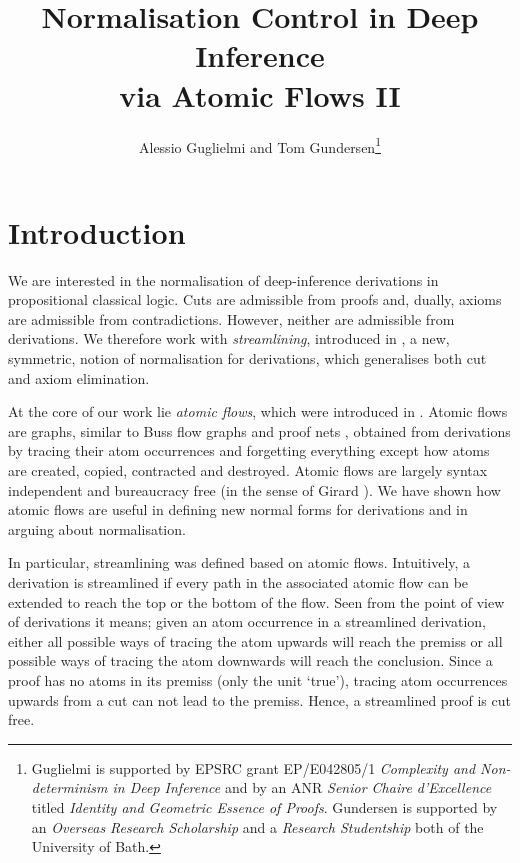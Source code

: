 \documentclass[a4paper]{llncs}
\begin{document}
\title{Normalisation Control in Deep Inference \\ via Atomic Flows II}

\author{Alessio Guglielmi and Tom Gundersen\thanks{Guglielmi is supported by EPSRC grant EP/E042805/1 \emph{Complexity and Non-determinism in Deep Inference} and by an ANR \emph{Senior Chaire d'Excellence} titled \emph{Identity and Geometric Essence of Proofs}. Gundersen is supported by an \emph{Overseas Research Scholarship} and a \emph{Research Studentship} both of the University of Bath.}}


\maketitle

\section{Introduction}


We are interested in the normalisation of deep-inference derivations in propositional classical logic. Cuts are admissible from proofs and, dually, axioms are admissible from contradictions. However, neither are admissible from derivations. We therefore work with \emph{streamlining}, introduced in \cite{GuglGund:07:Normalis:lr}, a new, symmetric, notion of normalisation for derivations, which generalises both cut and axiom elimination.

At the core of our work lie \emph{atomic flows}, which were introduced in \cite{GuglGund:07:Normalis:lr}. Atomic flows are graphs, similar to Buss flow graphs \cite{Buss:91:The-Unde:uq} and proof nets \cite{Gira:87:Linear-L:wm}, obtained from derivations by tracing their atom occurrences and forgetting everything except how atoms are created, copied, contracted and destroyed. Atomic flows are largely syntax independent and bureaucracy free (in the sense of Girard \cite{Gira:89:Geometry:sh}). We have shown how atomic flows are useful in defining new normal forms for derivations and in arguing about normalisation.

In particular, streamlining was defined based on atomic flows. Intuitively, a derivation is streamlined if every path in the associated atomic flow can be extended to reach the top or the bottom of the flow. Seen from the point of view of derivations it means; given an atom occurrence in a streamlined derivation, either all possible ways of tracing the atom upwards will reach the premiss or all possible ways of tracing the atom downwards will reach the conclusion. Since a proof has no atoms in its premiss (only the unit `true'), tracing atom occurrences upwards from a cut can not lead to the premiss. Hence, a streamlined proof is cut free.
\end{document}
